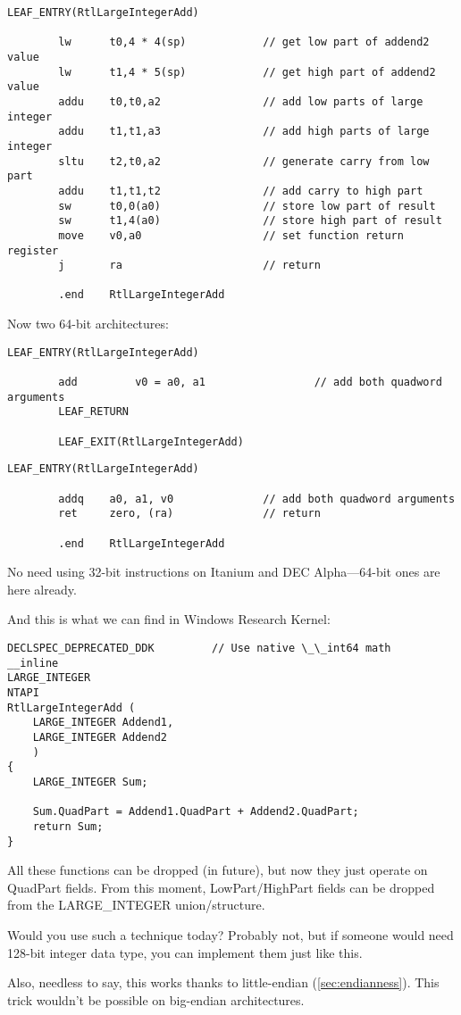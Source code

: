 \begin{lstlisting}[caption=MIPS arch]
        LEAF_ENTRY(RtlLargeIntegerAdd)

        lw      t0,4 * 4(sp)            // get low part of addend2 value
        lw      t1,4 * 5(sp)            // get high part of addend2 value
        addu    t0,t0,a2                // add low parts of large integer
        addu    t1,t1,a3                // add high parts of large integer
        sltu    t2,t0,a2                // generate carry from low part
        addu    t1,t1,t2                // add carry to high part
        sw      t0,0(a0)                // store low part of result
        sw      t1,4(a0)                // store high part of result
        move    v0,a0                   // set function return register
        j       ra                      // return

        .end    RtlLargeIntegerAdd
\end{lstlisting}

Now two 64-bit architectures:

\begin{lstlisting}[caption=Itanium arch]
        LEAF_ENTRY(RtlLargeIntegerAdd)

        add         v0 = a0, a1                 // add both quadword arguments
        LEAF_RETURN

        LEAF_EXIT(RtlLargeIntegerAdd)
\end{lstlisting}

\begin{lstlisting}[caption=DEC Alpha arch]
        LEAF_ENTRY(RtlLargeIntegerAdd)

        addq    a0, a1, v0              // add both quadword arguments
        ret     zero, (ra)              // return

        .end    RtlLargeIntegerAdd
\end{lstlisting}

No need using 32-bit instructions on Itanium and DEC Alpha---64-bit ones are here already.

And this is what we can find in Windows Research Kernel:

\begin{lstlisting}[style=customc]
DECLSPEC_DEPRECATED_DDK         // Use native \_\_int64 math
__inline
LARGE_INTEGER
NTAPI
RtlLargeIntegerAdd (
    LARGE_INTEGER Addend1,
    LARGE_INTEGER Addend2
    )
{
    LARGE_INTEGER Sum;

    Sum.QuadPart = Addend1.QuadPart + Addend2.QuadPart;
    return Sum;
}
\end{lstlisting}

All these functions can be dropped (in future), but now they just operate on QuadPart fields.
From this moment, LowPart/HighPart fields can be dropped from the LARGE\_INTEGER union/structure.

Would you use such a technique today?
Probably not, but if someone would need 128-bit integer data type, you can implement them just like this.

Also, needless to say, this works thanks to little-endian (\ref{sec:endianness}).
This trick wouldn't be possible on big-endian architectures.

